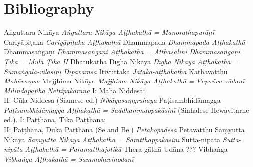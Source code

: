 \ifplastex
	\chapter{Bibliography}
\else
\fi
\begin{thebibliography}{xxxxxxxxxxx}
 Aṅguttara Nikāya
 \emph{Aṅguttara Nikāya Aṭṭhakathā = Manorathapurāṇī}
 Cariyāpiṭaka
 \emph{Cariyāpiṭaka Aṭṭhakathā}
 Dhammapada
 \emph{Dhammapada Aṭṭhakathā}
 Dhammasaṅgaṇī
 \emph{Dhammasaṅgaṇi Aṭṭhakathā = Atthasālinī}
 \emph{Dhammasaṅgaṇī Ṭīkā = Mūla Ṭīkā II}
 Dhātukathā
 Dīgha Nikāya
 \emph{Dīgha Nikāya Aṭṭhakathā = Sumaṅgala-vilāsinī}
 \emph{Dīpavaṃsa}
 Itivuttaka
 \emph{Jātaka-aṭṭhakathā}
 Kathāvatthu
 \emph{Mahāvaṃsa}
 Majjhima Nikāya
 \emph{Majjhima Nikāya Aṭṭhakathā = Papañca-sūdanī}
 \emph{Milindapañhā}
 \emph{Nettipakaraṇa}
 I: Mahā Niddesa;\\ II: Cūḷa Niddesa (Siamese ed.)
 \emph{Nikāyasaṃgrahaya}
 Paṭisambhidāmagga
 \emph{Paṭisambhidāmagga Aṭṭhakathā = Saddhammappakāsinī} (Sinhalese Hewavitarne ed.).
 I: Paṭṭhāna, Tika Paṭṭhāna;\\ II: Paṭṭhāna, Duka Paṭṭhāna (Se and Be.)
 \emph{Peṭakopadesa}
 Petavatthu
 Saṃyutta Nikāya
 \emph{Saṃyutta Nikāya Aṭṭhakathā = Sāratthappakāsinī}
 Sutta-nipāta
 \emph{Sutta-nipāta Aṭṭhakathā = Paramatthajotikā}
 Thera-gāthā
 Udāna
 ???
 Vibhaṅga
 \emph{Vibhaṅga Aṭṭhakathā = Sammohavinodanī}

\end{thebibliography}
